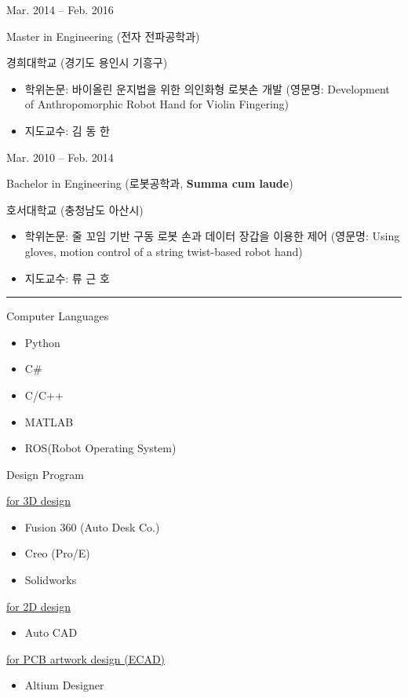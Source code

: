 \documentclass[a4paper,10pt]{article}
\newlength{\cvcolumngapwidth}
\newlength{\cvleftcolumnwidth}
\newlength{\cvrightcolumnwidth}
\newcommand{\cvsectionstyle}[1]{{\normalsize\cvsectionfont\textcolor{cvsectioncolor}{#1}}}
\newcommand{\cvtitlestyle}[1]{{\large\cvtitlefont\textcolor{cvtitlecolor}{#1}}}
\newcommand{\cvdurationstyle}[1]{{\small\cvdurationfont\textcolor{cvdurationcolor}{#1}}}
\newcommand{\cvheadingstyle}[1]{{\normalsize\cvheadingfont\textcolor{cvheadingcolor}{#1}}}
\newlength{\cvafteritemskipamount}
\newlength{\cvaftersectionskipamount}
\newlength{\cvbetweensectionandheadingextraskipamount}
\newlength{\cvaftertitleskipamount}
\newlength{\cvparskip}
\newcommand{\cvsection}[1]{
    \begin{minipage}[t]{\cvleftcolumnwidth}
        \raggedleft\cvsectionstyle{#1}
    \end{minipage}%
    \hspace{\cvcolumngapwidth}%
    \begin{minipage}[t]{\cvrightcolumnwidth}
        \textcolor{cvrulecolor}{\rule{\cvrightcolumnwidth}{0.3mm}}
    \end{minipage}

    \vspace{\cvaftersectionskipamount}
}
\newcommand{\cvitem}[2]{
    \begin{minipage}[t]{\cvleftcolumnwidth}
        \raggedleft #1
    \end{minipage}%
    \hspace{\cvcolumngapwidth}%
    \begin{minipage}[t]{\cvrightcolumnwidth}
        \setlength{\parskip}{\cvparskip} #2
    \end{minipage}

    \vspace{\cvafteritemskipamount}
}
\newcommand{\cvtitle}[1]{
    \cvtitlestyle{#1}

    \vspace{\cvaftertitleskipamount}
    \vspace{-\cvparskip}
}
\begin{document}
\cvitem{
    \cvdurationstyle{Mar. 2014 -- Feb. 2016}
}{
    \cvtitle{Master in Engineering (전자 전파공학과)}
    경희대학교 (경기도 용인시 기흥구)
    \begin{itemize}[leftmargin=*]
        \item 학위논문: 바이올린 운지법을 위한 의인화형 로봇손 개발 
        \newline (영문명: Development of Anthropomorphic Robot Hand for Violin Fingering)
        \item 지도교수: 김 동 한
    \end{itemize}
}

\cvitem{
    \cvdurationstyle{Mar. 2010 -- Feb. 2014}
}{
    \cvtitle{Bachelor in Engineering (로봇공학과, \textbf{Summa cum laude})}
    호서대학교 (충청남도 아산시)
    \begin{itemize}[leftmargin=*]
        \item 학위논문: 줄 꼬임 기반 구동 로봇 손과 데이터 장갑을 이용한 제어 
        \newline (영문명: Using gloves, motion control of a string twist-based robot hand)
        \item 지도교수: 류 근 호
    \end{itemize}
}



\vspace*{1cm}

\cvsection{Technical skills}

\vspace{\cvbetweensectionandheadingextraskipamount}

\cvitem{
    \cvheadingstyle{Computer Languages}
}{
    \begin{itemize}
    \item Python
    \item C\#
    \item C/C++
    \item MATLAB
    \item ROS(Robot Operating System)
            
    \end{itemize}
}
\cvitem{
    \cvheadingstyle{Design Program}
}{
    \underline{for 3D design}
    \begin{itemize}
        \item Fusion 360 (Auto Desk Co.)
        \item Creo (Pro/E)
        \item Solidworks
    \end{itemize}
    
    \underline{for 2D design}
    \begin{itemize}
        \item Auto CAD
    \end{itemize}
    
    \underline{for PCB artwork design (ECAD)}
    \begin{itemize}
        \item Altium Designer
    \end{itemize}
    
}
\end{document}
